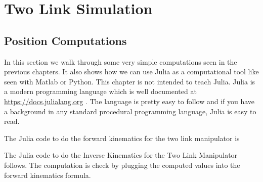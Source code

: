 \hypertarget{two-link-simulation}{%
\section{Two Link Simulation}\label{two-link-simulation}}

\hypertarget{position-computations}{%
\subsection{Position Computations}\label{position-computations}}

In this section we walk through some very simple computations seen in
the previous chapters. It also shows how we can use Julia as a
computational tool like seen with Matlab or Python. This chapter is not
intended to teach Julia. Julia is a modern programming language which is
well documented at \url{https://docs.julialang.org} . The language is
pretty easy to follow and if you have a background in any standard
procedural programming language, Julia is easy to read.

The Julia code to do the forward kinematics for the two link manipulator
is

\hypertarget{listFKTwoLink}{%
\label{listFKTwoLink}}%
\begin{Shaded}
\begin{Highlighting}[]
\OperatorTok{,}\OperatorTok{=} \OperatorTok{,}
\OperatorTok{,}\OperatorTok{=} \OperatorTok{,} 
\OperatorTok{=}\OperatorTok{*}\OperatorTok{+}\OperatorTok{+}\OperatorTok{*}
\OperatorTok{=}\OperatorTok{*}\OperatorTok{+}\OperatorTok{+}\OperatorTok{*}
\OperatorTok{,}\OperatorTok{,} \OperatorTok{,}
\end{Highlighting}
\end{Shaded}

The Julia code to do the Inverse Kinematics for the Two Link Manipulator
follows. The computation is check by plugging the computed values into
the forward kinematics formula.

